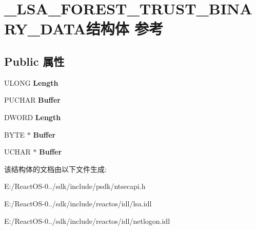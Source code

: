 \hypertarget{struct___l_s_a___f_o_r_e_s_t___t_r_u_s_t___b_i_n_a_r_y___d_a_t_a}{}\section{\+\_\+\+L\+S\+A\+\_\+\+F\+O\+R\+E\+S\+T\+\_\+\+T\+R\+U\+S\+T\+\_\+\+B\+I\+N\+A\+R\+Y\+\_\+\+D\+A\+T\+A结构体 参考}
\label{struct___l_s_a___f_o_r_e_s_t___t_r_u_s_t___b_i_n_a_r_y___d_a_t_a}
\subsection*{Public 属性}
\begin{DoxyCompactItemize}
\item 
\mbox{\label{struct___l_s_a___f_o_r_e_s_t___t_r_u_s_t___b_i_n_a_r_y___d_a_t_a_a5b32cf0a1974b816588d9890af86d829}} 
U\+L\+O\+NG {\bfseries Length}
\item 
\mbox{\label{struct___l_s_a___f_o_r_e_s_t___t_r_u_s_t___b_i_n_a_r_y___d_a_t_a_adf171e58af7705738fc70e8be854d8c4}} 
P\+U\+C\+H\+AR {\bfseries Buffer}
\item 
\mbox{\label{struct___l_s_a___f_o_r_e_s_t___t_r_u_s_t___b_i_n_a_r_y___d_a_t_a_aa55be10c49dfe9934321a88393073073}} 
D\+W\+O\+RD {\bfseries Length}
\item 
\mbox{\label{struct___l_s_a___f_o_r_e_s_t___t_r_u_s_t___b_i_n_a_r_y___d_a_t_a_aea01a3ffea7a905c5554903b02614756}} 
B\+Y\+TE $\ast$ {\bfseries Buffer}
\item 
\mbox{\label{struct___l_s_a___f_o_r_e_s_t___t_r_u_s_t___b_i_n_a_r_y___d_a_t_a_a19da2bfe307b8154fc432dcb28bae921}} 
U\+C\+H\+AR $\ast$ {\bfseries Buffer}
\end{DoxyCompactItemize}


该结构体的文档由以下文件生成\+:\begin{DoxyCompactItemize}
\item 
E\+:/\+React\+O\+S-\/0../sdk/include/psdk/ntsecapi.\+h\item 
E\+:/\+React\+O\+S-\/0../sdk/include/reactos/idl/lsa.\+idl\item 
E\+:/\+React\+O\+S-\/0../sdk/include/reactos/idl/netlogon.\+idl\end{DoxyCompactItemize}
